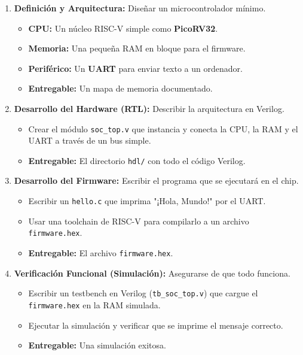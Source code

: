 \documentclass[12pt,a4paper]{article}
\begin{document}
\begin{enumerate}
    \item \textbf{Definición y Arquitectura:} Diseñar un microcontrolador mínimo.
    \begin{itemize}
        \item \textbf{CPU:} Un núcleo RISC-V simple como \textbf{PicoRV32}.
        \item \textbf{Memoria:} Una pequeña RAM en bloque para el firmware.
        \item \textbf{Periférico:} Un \textbf{UART} para enviar texto a un ordenador.
        \item \textbf{Entregable:} Un mapa de memoria documentado.
    \end{itemize}
    
    \item \textbf{Desarrollo del Hardware (RTL):} Describir la arquitectura en Verilog.
    \begin{itemize}
        \item Crear el módulo \texttt{soc\_top.v} que instancia y conecta la CPU, la RAM y el UART a través de un bus simple.
        \item \textbf{Entregable:} El directorio \texttt{hdl/} con todo el código Verilog.
    \end{itemize}

    \item \textbf{Desarrollo del Firmware:} Escribir el programa que se ejecutará en el chip.
    \begin{itemize}
        \item Escribir un \texttt{hello.c} que imprima "¡Hola, Mundo!" por el UART.
        \item Usar una toolchain de RISC-V para compilarlo a un archivo \texttt{firmware.hex}.
        \item \textbf{Entregable:} El archivo \texttt{firmware.hex}.
    \end{itemize}

    \item \textbf{Verificación Funcional (Simulación):} Asegurarse de que todo funciona.
    \begin{itemize}
        \item Escribir un testbench en Verilog (\texttt{tb\_soc\_top.v}) que cargue el \texttt{firmware.hex} en la RAM simulada.
        \item Ejecutar la simulación y verificar que se imprime el mensaje correcto.
        \item \textbf{Entregable:} Una simulación exitosa.
    \end{itemize}


\end{enumerate}
\end{document}
